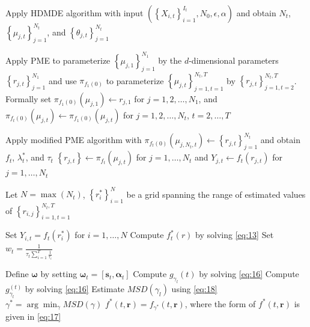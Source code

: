 \documentclass[12pt]{article}
\theoremstyle{definition}
\begin{document}
\begin{algorithm}
\caption{Longitudinal Principal Manifold Estimation (LPME)}\label{alg:lpme}
 {
  Apply HDMDE algorithm with input $\left(\left\{X_{i, t}\right\}_{i = 1}^{I_t}, N_0, \epsilon, \alpha\right)$ and obtain $N_t$, $\left\{\mu_{j, t}\right\}_{j = 1}^{N_t}$, and $\left\{\theta_{j, t}\right\}_{j = 1}^{N_t}$\;
}

  Apply PME to parameterize $\left\{\mu_{j, 1}\right\}_{j = 1}^{N_1}$ by the $d$-dimensional parameters $\left\{r_{j, t}\right\}_{j = 1}^{N_1}$ and use $\pi_{f_1(0)}$ to parameterize $\left\{\mu_{j, t}\right\}_{j=1, t = 1}^{N_t, T}$ by $\left\{r_{j, t}\right\}_{j=1, t=2}^{N_t, T}$. Formally set $\pi_{f_1(0)}(\mu_{j, 1}) \gets r_{j, 1}$ for $j = 1, 2, \dots, N_1$, and $\pi_{f_{t}(0)}(\mu_{j, t}) \gets \pi_{f_1(0)}(\mu_{j, t})$ for $j = 1, 2, \dots, N_t$, $t = 2, \dots, T$\;

 {
  Apply modified PME algorithm with $\pi_{f_t(0)}(\mu_{j, N_t, t}) \gets \left\{r_{j, t}\right\}_{j = 1}^{N_t}$ and obtain $f_t$, $\lambda_t^*$, and $\tau_t$\;
  $\left\{r_{j, t}\right\} \gets \pi_{f_t}(\mu_{j, t})$ for $j = 1, \dots, N_t$ and $Y_{j, t} \gets f_t(r_{j, t})$ for $j = 1, \dots, N_t$\;
}

  Let $N = \max(N_t)$, $\left\{r_i^*\right\}_{i=1}^{N}$ be a grid spanning the range of estimated values of $\left\{r_{i, j}\right\}_{i=1, t=1}^{N_t, T}$\;

 {
  Set $Y_{i, t} = f_t(r_{i}^*)$ for $i = 1, \dots, N$\;
  Compute $f_t^*(r)$ by solving \eqref{eq:13}\;
  Set $w_t = \frac{1}{\tau_t \sum_{i=1}^{T}\frac{1}{\tau_i}}$\;
}

  Define $\mathbf{\omega}$ by setting $\mathbf{\omega}_t = \left[\mathbf{s}_t, \mathbf{\alpha}_t\right]$\;
   {
    Compute $g_{\gamma_l}(t)$ by solving \eqref{eq:16}\;
     {
      Compute $g_{\gamma_l}^{(t)}$ by solving \eqref{eq:16}\;
    }
    Estimate $MSD(\gamma_l)$ using \eqref{eq:18}\;
  }
  $\gamma^* = \arg\min_{\gamma}MSD(\gamma)$\;
  $f^*(t, \mathbf{r}) = f_{\gamma^*}(t, \mathbf{r})$, where the form of $f^*(t, \mathbf{r})$ is given in \eqref{eq:17}
\end{algorithm}
\end{document}
